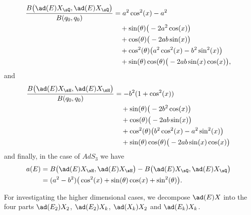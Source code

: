 \begin{equation}            \label{LONGEqKillingEXQEXQ}
    \begin{aligned}[]
        \frac{ B\big( \ad(E)X_{\sQ},\ad(E)X_{\sQ} \big)}{B(q_0,q_0)}&=a^2\cos^2(x)-a^2\\
                &\quad +\sin(\theta)\big( -2a^2\cos(x) \big)\\
                &\quad +\cos(\theta)\big( -2ab\sin(x) \big)\\
                &\quad +\cos^2(\theta)\big( a^2\cos^2(x)-b^2\sin^2(x) \big)\\
                &\quad +\sin(\theta)\cos(\theta)\big( -2ab\sin(x)\cos(x) \big),
    \end{aligned}
\end{equation}
and
\begin{equation}
    \begin{aligned}[]
        \frac{ B\big( \ad(E)X_{\sH},\ad(E)X_{\sH} \big)}{B(q_0,q_0)}&= -b^2(1+\cos^2(x))\\
                            &\quad +\sin(\theta)\big( -2b^2\cos(x) \big)\\
                            &\quad +\cos(\theta)\big( -2ab\sin(x) \big)\\
                            &\quad +\cos^2(\theta)\big( b^2\cos^2(x)-a^2\sin^2(x) \big)\\
                            &\quad +\sin(\theta)\cos(\theta)\big( -2ab\sin(x)\cos(x) \big)
    \end{aligned}
\end{equation}
and finally, in the case of $AdS_3$ we have
\begin{equation}        \label{LONGEqaEdansAdsTrois}
    \begin{aligned}[]
        a(E)&=B\big( \ad(E)X_{\sH},\ad(E)X_{\sH} \big)-B\big( \ad(E)X_{\sQ},\ad(E)X_{\sQ} \big)\\
            &=(a^2-b^2)\big( \cos^2(x)+\sin(\theta)\cos(x)+\sin^2(\theta) \big).
    \end{aligned}
\end{equation}

For investigating the higher dimensional cases, we decompose $\ad(E)X$ into the four parts $\ad(E_2)X_2$, $\ad(E_2)X_k$, $\ad(X_k)X_2$ and $\ad(E_k)X_k$. 


